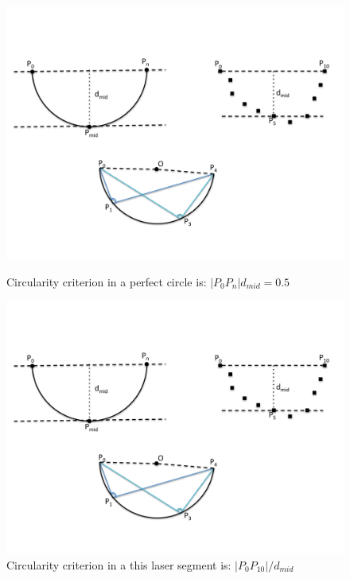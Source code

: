 \begin{enumerate}
\begin{figure}[ht!]
  \centering
  \begin{minipage}[b]{0.49\textwidth}
    \includegraphics[width=\textwidth]{pics/circ1}   
    \caption{Circularity criterion in a perfect circle is: $|P_0P_n|d_{mid}=0.5$}
     \label{fig:circ1}
  \end{minipage}
  \hfill
  \begin{minipage}[b]{0.49\textwidth}
    \includegraphics[width=\textwidth]{pics/circ2}    
    \caption{Circularity criterion in a this laser segment is: $|P_0P_{10}|/d_{mid}$}
    \label{fig:circ2}
  \end{minipage}
\end{figure}


\end{enumerate}

